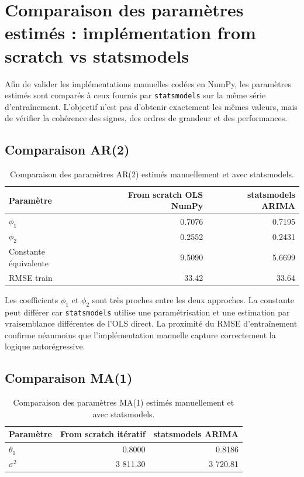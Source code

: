 \documentclass[12pt,a4paper]{report}
\begin{document}
\section{Comparaison des paramètres estimés : implémentation from scratch vs statsmodels}
Afin de valider les implémentations manuelles codées en NumPy, les paramètres estimés sont comparés à ceux fournis par \texttt{statsmodels} sur la même série d'entraînement. L'objectif n'est pas d'obtenir exactement les mêmes valeurs, mais de vérifier la cohérence des signes, des ordres de grandeur et des performances.

\subsection{Comparaison AR(2)}
\begin{table}[H]
\centering
\begin{tabular}{lrr}
\toprule
Paramètre & From scratch OLS NumPy & statsmodels ARIMA \\
\midrule
$\phi_1$ & 0.7076 & 0.7195 \\
$\phi_2$ & 0.2552 & 0.2431 \\
Constante équivalente & 9.5090 & 5.6699 \\
RMSE train & 33.42 & 33.64 \\
\bottomrule
\end{tabular}
\caption{Comparaison des paramètres AR(2) estimés manuellement et avec statsmodels.}
\end{table}

Les coefficients $\phi_1$ et $\phi_2$ sont très proches entre les deux approches. La constante peut différer car \texttt{statsmodels} utilise une paramétrisation et une estimation par vraisemblance différentes de l'OLS direct. La proximité du RMSE d'entraînement confirme néanmoins que l'implémentation manuelle capture correctement la logique autorégressive.

\subsection{Comparaison MA(1)}
\begin{table}[H]
\centering
\begin{tabular}{lrr}
\toprule
Paramètre & From scratch itératif & statsmodels ARIMA \\
\midrule
$\theta_1$ & 0.8000 & 0.8186 \\
$\sigma^2$ & 3 811.30 & 3 720.81 \\
\bottomrule
\end{tabular}
\caption{Comparaison des paramètres MA(1) estimés manuellement et avec statsmodels.}
\end{table}
\end{document}
